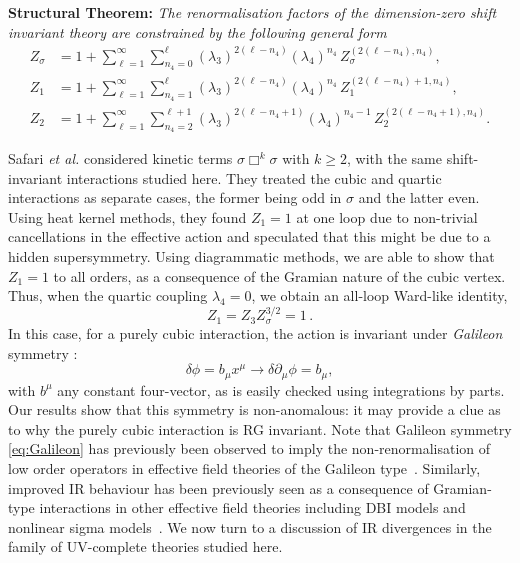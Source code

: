 \documentclass[a4paper,11pt]{article}
\begin{document}
\begin{tcolorbox}[ colframe=black, colback=blue!1!white, sharp corners, boxsep=4pt , boxrule=0.3mm]
\textbf{Structural Theorem:}
\emph{The renormalisation factors of the dimension-zero shift invariant theory are constrained by the following  general form}
\begin{align}
    \label{eq:nonrenormphi}
    Z_{\sigma}&=1+\sum_{\ell=1}^\infty\sum_{n_4=0}^{\ell} \left(\lambda_3\right)^{2(\ell-n_4)}\left(\lambda_4\right)^{n_4}\,Z_\sigma^{(2(\ell-n_4),n_4)},
    \\
    \label{eq:nonrenorm1}
    Z_{1}&=1+\sum_{\ell=1}^\infty\sum_{n_4=1}^{\ell} \left(\lambda_3\right)^{2(\ell-n_4)}\left(\lambda_4\right)^{n_4}\,Z_1^{(2(\ell-n_4)+1,n_4)},
    \\
    \label{eq:nonrenorm2}
    Z_{2}&=1+\sum_{\ell=1}^\infty\sum_{n_4=2}^{\ell+1} \left(\lambda_3\right)^{2(\ell-n_4+1)}\left(\lambda_4\right)^{n_4-1}\,Z_2^{(2(\ell-n_4+1),n_4)}.
\end{align}
\end{tcolorbox}

Safari {\it et al.} considered kinetic terms $\sigma \Box^k \sigma$ with $k\geq 2$, with the same shift-invariant interactions studied here. They treated the cubic and quartic interactions as separate cases, the former being odd in $\sigma$ and the latter even. 
Using heat kernel methods, they found $Z_1=1$ at one loop due to non-trivial cancellations in the effective action and speculated that this might be due to a hidden supersymmetry. Using diagrammatic methods, we are able to show that $Z_1=1$ to all orders, as a consequence of the Gramian nature of the cubic vertex. Thus, when the quartic coupling $\lambda_4=0$, we obtain an all-loop Ward-like identity,
\begin{equation}\label{eq:secondWI}
    Z_1 = Z_3 Z_\sigma^{3/2} = 1 \,.
\end{equation}
In this case, for a purely cubic interaction, the action is invariant under {\it Galileon} symmetry \cite{Nicolis:2008in,Kampf:2014rka}: 
 \begin{equation}\label{eq:Galileon}
    \delta \phi= b_\mu x^\mu \rightarrow \delta \partial_\mu \phi= b_\mu,
\end{equation}
with $b^\mu$ any constant four-vector, as is easily checked using integrations by parts. Our results show that this symmetry is non-anomalous: it may provide a clue as to why the purely cubic interaction is RG invariant. Note that Galileon symmetry \cref{eq:Galileon} has previously been observed to imply the non-renormalisation of low order operators in effective field theories of the Galileon type~\cite{Luty:2003vm,Hinterbichler:2015pqa,Goon_2016}. Similarly, improved IR behaviour has been previously seen as a consequence of Gramian-type interactions in other effective field theories including DBI models and nonlinear sigma models~\cite{Cheung:2014dqa,Cheung:2015ota}. We now turn to a discussion of IR divergences in the family of UV-complete theories studied here. 
\end{document}
